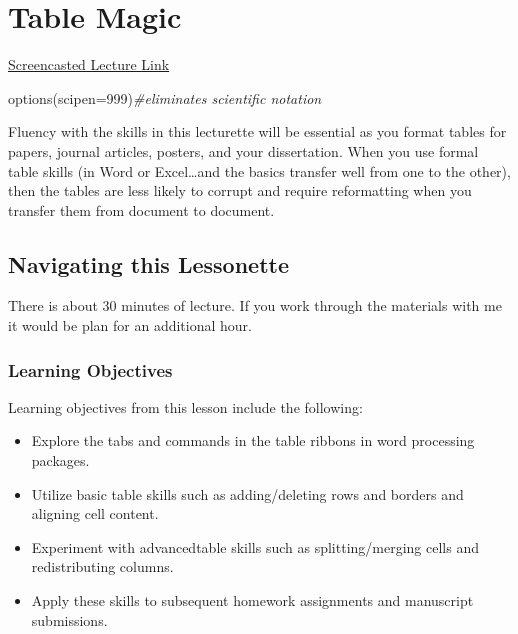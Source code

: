 \documentclass[
  english,
]{book}
\newenvironment{Shaded}{\begin{snugshade}}{\end{snugshade}}
\newcommand{\AttributeTok}[1]{\textcolor[rgb]{0.77,0.63,0.00}{#1}}
\newcommand{\CommentTok}[1]{\textcolor[rgb]{0.56,0.35,0.01}{\textit{#1}}}
\newcommand{\DecValTok}[1]{\textcolor[rgb]{0.00,0.00,0.81}{#1}}
\newcommand{\FunctionTok}[1]{\textcolor[rgb]{0.00,0.00,0.00}{#1}}
\newcommand{\NormalTok}[1]{#1}
\providecommand{\tightlist}{%
  \setlength{\itemsep}{0pt}\setlength{\parskip}{0pt}}
\begin{document}
\hypertarget{Tables}{%
\chapter{Table Magic}\label{Tables}}

\href{https://spu.hosted.panopto.com/Panopto/Pages/Viewer.aspx?pid=5f6035f2-0aff-476b-829c-ac240184c580}{Screencasted Lecture Link}

\begin{Shaded}
\begin{Highlighting}[]
\FunctionTok{options}\NormalTok{(}\AttributeTok{scipen=}\DecValTok{999}\NormalTok{)}\CommentTok{\#eliminates scientific notation}
\end{Highlighting}
\end{Shaded}

Fluency with the skills in this lecturette will be essential as you format tables for papers, journal articles, posters, and your dissertation. When you use formal table skills (in Word or Excel\ldots and the basics transfer well from one to the other), then the tables are less likely to corrupt and require reformatting when you transfer them from document to document.

\hypertarget{navigating-this-lessonette-1}{%
\section{Navigating this Lessonette}\label{navigating-this-lessonette-1}}

There is about 30 minutes of lecture. If you work through the materials with me it would be plan for an additional hour.

\hypertarget{learning-objectives-2}{%
\subsection{Learning Objectives}\label{learning-objectives-2}}

Learning objectives from this lesson include the following:

\begin{itemize}
\tightlist
\item
  Explore the tabs and commands in the table ribbons in word processing packages.
\item
  Utilize basic table skills such as adding/deleting rows and borders and aligning cell content.
\item
  Experiment with advancedtable skills such as splitting/merging cells and redistributing columns.
\item
  Apply these skills to subsequent homework assignments and manuscript submissions.
\end{itemize}
\end{document}

